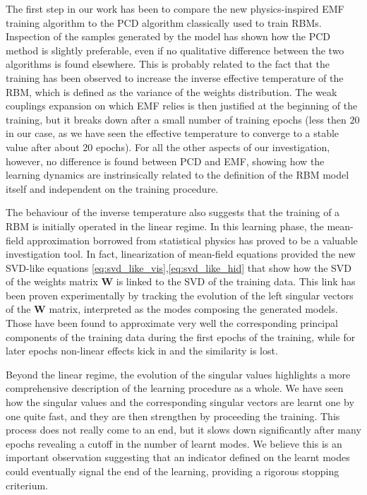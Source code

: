 \documentclass{revtex4-1}
\begin{document}
The first step in our work has been to compare the new physics-inspired EMF training algorithm to the PCD algorithm classically used to train RBMs. Inspection of the samples generated by the model has shown how the PCD method is slightly preferable, even if no qualitative difference between the two algorithms is found elsewhere. This is probably related to the fact that the training has been observed to increase the inverse effective temperature of the RBM, which is defined as the variance of the weights distribution. The weak couplings expansion on which EMF relies is then justified at the beginning of the training, but it breaks down after a small number of training epochs (less then \(20\) in our case, as we have seen the effective temperature to converge to a stable value after about \(20\) epochs). For all the other aspects of our investigation, however, no difference is found between PCD and EMF, showing how the learning dynamics are instrinsically related to the definition of the RBM model itself and independent on the training procedure.

The behaviour of the inverse temperature also suggests that the training of a RBM is initially operated in the linear regime. In this learning phase, the mean-field approximation borrowed from statistical physics has proved to be a valuable investigation tool. In fact, linearization of mean-field equations provided the new SVD-like equations \eqref{eq:svd_like_vis},\eqref{eq:svd_like_hid} that show how the SVD of the weights matrix \(\mathbf{W}\) is linked to the SVD of the training data. This link has been proven experimentally by tracking the evolution of the left singular vectors of the \(\mathbf{W}\) matrix, interpreted as the modes composing the generated models. Those have been found to approximate very well the corresponding principal components of the training data during the first epochs of the training, while for later epochs non-linear effects kick in and the similarity is lost.

Beyond the linear regime, the evolution of the singular values highlights a more comprehensive description of the learning procedure as a whole. We have seen how the singular values and the corresponding singular vectors are learnt one by one quite fast, and they are then strengthen by proceeding the training. This process does not really come to an end, but it slows down significantly after many epochs revealing a cutoff in the number of learnt modes. We believe this is an important observation suggesting that an indicator defined on the learnt modes could eventually signal the end of the learning, providing a rigorous stopping criterium.
\end{document}
